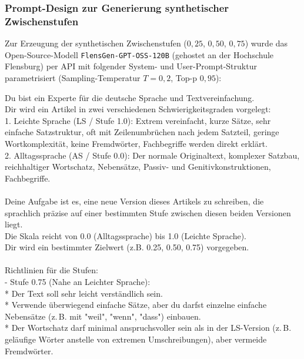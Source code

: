 \subsubsection{Prompt-Design zur Generierung synthetischer Zwischenstufen}

Zur Erzeugung der synthetischen Zwischenstufen ($0{,}25$, $0{,}50$, $0{,}75$) wurde das Open-Source-Modell \texttt{FlensGen-GPT-OSS-120B} (gehostet an der Hochschule Flensburg) per API mit folgender System- und User-Prompt-Struktur parametrisiert (Sampling-Temperatur $T = 0{,}2$, Top-p $0{,}95$):

\begin{tcolorbox}[colback=gray!5!white,colframe=gray!60!black,title=\textbf{System-Prompt: Synthetische Komplexitätsabstufung},sharp corners,boxrule=0.8pt]
\small\ttfamily
Du bist ein Experte für die deutsche Sprache und Textvereinfachung.\\
Dir wird ein Artikel in zwei verschiedenen Schwierigkeitsgraden vorgelegt:\\
1. Leichte Sprache (LS / Stufe 1.0): Extrem vereinfacht, kurze Sätze, sehr einfache Satzstruktur, oft mit Zeilenumbrüchen nach jedem Satzteil, geringe Wortkomplexität, keine Fremdwörter, Fachbegriffe werden direkt erklärt.\\
2. Alltagssprache (AS / Stufe 0.0): Der normale Originaltext, komplexer Satzbau, reichhaltiger Wortschatz, Nebensätze, Passiv- und Genitivkonstruktionen, Fachbegriffe.\\
\\
Deine Aufgabe ist es, eine neue Version dieses Artikels zu schreiben, die sprachlich präzise auf einer bestimmten Stufe zwischen diesen beiden Versionen liegt.\\
Die Skala reicht von 0.0 (Alltagssprache) bis 1.0 (Leichte Sprache).\\
Dir wird ein bestimmter Zielwert (z.B. 0.25, 0.50, 0.75) vorgegeben.\\
\\
Richtlinien für die Stufen:\\
- Stufe 0.75 (Nahe an Leichter Sprache):\\
\hspace*{1em}* Der Text soll sehr leicht verständlich sein.\\
\hspace*{1em}* Verwende überwiegend einfache Sätze, aber du darfst einzelne einfache Nebensätze (z.\,B. mit "weil", "wenn", "dass") einbauen.\\
\hspace*{1em}* Der Wortschatz darf minimal anspruchsvoller sein als in der LS-Version (z.\,B. geläufige Wörter anstelle von extremen Umschreibungen), aber vermeide Fremdwörter.\\

\end{tcolorbox}

